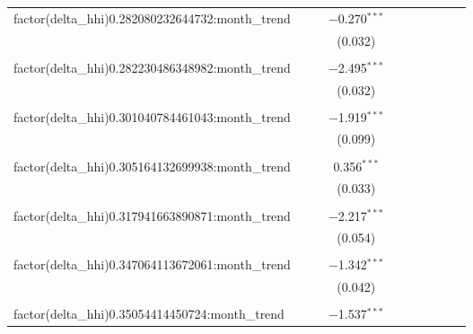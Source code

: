 \begin{table}[H]
{\begin{tabular}{@{\extracolsep{5pt}}lccccccccc}
  factor(delta\_hhi)0.282080232644732:month\_trend &  &  & $-$0.270$^{***}$ &  &  &  &  &  &  \\  

   &  &  & (0.032) &  &  &  &  &  &  \\  

   & & & & & & & & & \\  

  factor(delta\_hhi)0.282230486348982:month\_trend &  &  & $-$2.495$^{***}$ &  &  &  &  &  &  \\  

   &  &  & (0.032) &  &  &  &  &  &  \\  

   & & & & & & & & & \\  

  factor(delta\_hhi)0.301040784461043:month\_trend &  &  & $-$1.919$^{***}$ &  &  &  &  &  &  \\  

   &  &  & (0.099) &  &  &  &  &  &  \\  

   & & & & & & & & & \\  

  factor(delta\_hhi)0.305164132699938:month\_trend &  &  & 0.356$^{***}$ &  &  &  &  &  &  \\  

   &  &  & (0.033) &  &  &  &  &  &  \\  

   & & & & & & & & & \\  

  factor(delta\_hhi)0.317941663890871:month\_trend &  &  & $-$2.217$^{***}$ &  &  &  &  &  &  \\  

   &  &  & (0.054) &  &  &  &  &  &  \\  

   & & & & & & & & & \\  

  factor(delta\_hhi)0.347064113672061:month\_trend &  &  & $-$1.342$^{***}$ &  &  &  &  &  &  \\  

   &  &  & (0.042) &  &  &  &  &  &  \\  

   & & & & & & & & & \\  

  factor(delta\_hhi)0.35054414450724:month\_trend &  &  & $-$1.537$^{***}$ &  &  &  &  &  &  \\  


\end{tabular}}
\end{table}
